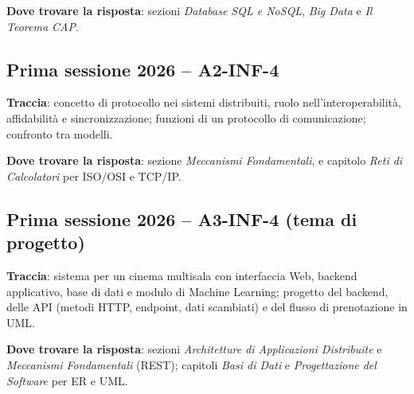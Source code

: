 \textbf{Dove trovare la risposta}: sezioni \emph{Database SQL e NoSQL}, \emph{Big Data} e \emph{Il Teorema CAP}.

\subsection*{Prima sessione 2026 -- A2-INF-4}
\textbf{Traccia}: concetto di protocollo nei sistemi distribuiti, ruolo nell'interoperabilità, affidabilità e sincronizzazione; funzioni di un protocollo di comunicazione; confronto tra modelli.

\textbf{Dove trovare la risposta}: sezione \emph{Meccanismi Fondamentali}, e capitolo \emph{Reti di Calcolatori} per ISO/OSI e TCP/IP.

\subsection*{Prima sessione 2026 -- A3-INF-4 (tema di progetto)}
\textbf{Traccia}: sistema per un cinema multisala con interfaccia Web, backend applicativo, base di dati e modulo di Machine Learning; progetto del backend, delle API (metodi HTTP, endpoint, dati scambiati) e del flusso di prenotazione in UML.

\textbf{Dove trovare la risposta}: sezioni \emph{Architetture di Applicazioni Distribuite} e \emph{Meccanismi Fondamentali} (REST); capitoli \emph{Basi di Dati} e \emph{Progettazione del Software} per ER e UML.
